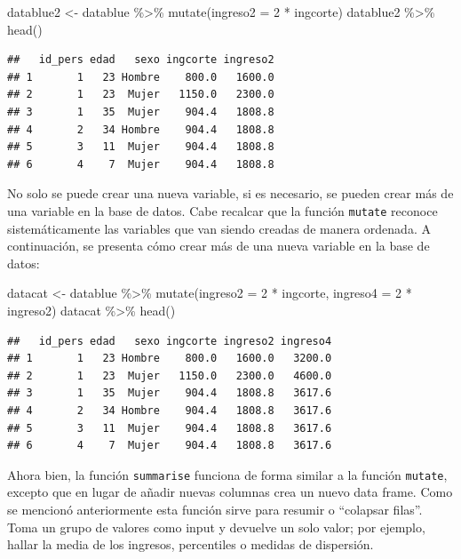 \documentclass[
  12pt,
]{book}
\newenvironment{Shaded}{\begin{snugshade}}{\end{snugshade}}
\newcommand{\AttributeTok}[1]{\textcolor[rgb]{0.77,0.63,0.00}{#1}}
\newcommand{\DecValTok}[1]{\textcolor[rgb]{0.00,0.00,0.81}{#1}}
\newcommand{\FunctionTok}[1]{\textcolor[rgb]{0.00,0.00,0.00}{#1}}
\newcommand{\NormalTok}[1]{#1}
\newcommand{\OtherTok}[1]{\textcolor[rgb]{0.56,0.35,0.01}{#1}}
\newcommand{\SpecialCharTok}[1]{\textcolor[rgb]{0.00,0.00,0.00}{#1}}
\begin{document}
\begin{Shaded}
\begin{Highlighting}[]
\NormalTok{datablue2 }\OtherTok{\textless{}{-}}\NormalTok{ datablue }\SpecialCharTok{\%\textgreater{}\%} 
  \FunctionTok{mutate}\NormalTok{(}\AttributeTok{ingreso2 =} \DecValTok{2} \SpecialCharTok{*}\NormalTok{ ingcorte)}
\NormalTok{datablue2 }\SpecialCharTok{\%\textgreater{}\%} \FunctionTok{head}\NormalTok{()}
\end{Highlighting}
\end{Shaded}

\begin{verbatim}
##   id_pers edad   sexo ingcorte ingreso2
## 1       1   23 Hombre    800.0   1600.0
## 2       1   23  Mujer   1150.0   2300.0
## 3       1   35  Mujer    904.4   1808.8
## 4       2   34 Hombre    904.4   1808.8
## 5       3   11  Mujer    904.4   1808.8
## 6       4    7  Mujer    904.4   1808.8
\end{verbatim}

No solo se puede crear una nueva variable, si es necesario, se pueden crear más de una variable en la base de datos. Cabe recalcar que la función \texttt{mutate} reconoce sistemáticamente las variables que van siendo creadas de manera ordenada. A continuación, se presenta cómo crear más de una nueva variable en la base de datos:

\begin{Shaded}
\begin{Highlighting}[]
\NormalTok{datacat }\OtherTok{\textless{}{-}}\NormalTok{ datablue }\SpecialCharTok{\%\textgreater{}\%} 
  \FunctionTok{mutate}\NormalTok{(}\AttributeTok{ingreso2 =} \DecValTok{2} \SpecialCharTok{*}\NormalTok{ ingcorte,}
         \AttributeTok{ingreso4 =} \DecValTok{2} \SpecialCharTok{*}\NormalTok{ ingreso2)}
\NormalTok{datacat }\SpecialCharTok{\%\textgreater{}\%} \FunctionTok{head}\NormalTok{()}
\end{Highlighting}
\end{Shaded}

\begin{verbatim}
##   id_pers edad   sexo ingcorte ingreso2 ingreso4
## 1       1   23 Hombre    800.0   1600.0   3200.0
## 2       1   23  Mujer   1150.0   2300.0   4600.0
## 3       1   35  Mujer    904.4   1808.8   3617.6
## 4       2   34 Hombre    904.4   1808.8   3617.6
## 5       3   11  Mujer    904.4   1808.8   3617.6
## 6       4    7  Mujer    904.4   1808.8   3617.6
\end{verbatim}

Ahora bien, la función \texttt{summarise} funciona de forma similar a la función \texttt{mutate}, excepto que en lugar de añadir nuevas columnas crea un nuevo data frame. Como se mencionó anteriormente esta función sirve para resumir o ``colapsar filas''. Toma un grupo de valores como input y devuelve un solo valor; por ejemplo, hallar la media de los ingresos, percentiles o medidas de dispersión.
\end{document}
